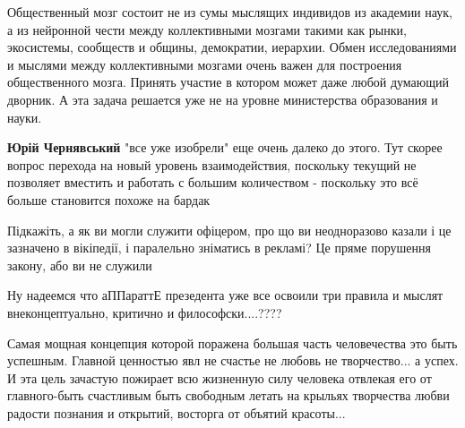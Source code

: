 \begin{itemize}
Общественный мозг состоит не из сумы мыслящих индивидов из академии наук, а из
нейронной чести между коллективными мозгами такими как рынки, экосистемы,
сообществ и общины, демократии, иерархии. Обмен исследованиями и мыслями между
коллективными мозгами очень важен для построения общественного мозга. Принять
участие в котором может даже любой думающий дворник. А эта задача решается уже
не на уровне министерства образования и науки.

\begin{itemize}
 
\textbf{Юрій Чернявський} "все уже изобрели" еще очень далеко до этого. Тут скорее вопрос перехода на новый уровень взаимодействия, поскольку текущий не позволяет вместить и работать с большим количеством - поскольку это всё больше становится похоже на бардак
\end{itemize}

 

Підкажіть, а як ви могли служити офіцером, про що ви неодноразово казали і це
зазначено в вікіпедії, і паралельно зніматись в рекламі? Це пряме порушення
закону, або ви не служили

 
Ну надеемся что аППараттЕ презедента уже все освоили три правила и мыслят внеконцептуально, критично и философски....????


Самая мощная концепция которой поражена большая часть человечества это быть
успешным. Главной ценностью явл не счастье не любовь не творчество... а успех.
И эта цель зачастую пожирает всю жизненную силу человека отвлекая его от
главного-быть счастливым быть свободным летать на крыльях творчества любви
радости познания и открытий, восторга от объятий красоты...



\end{itemize}
